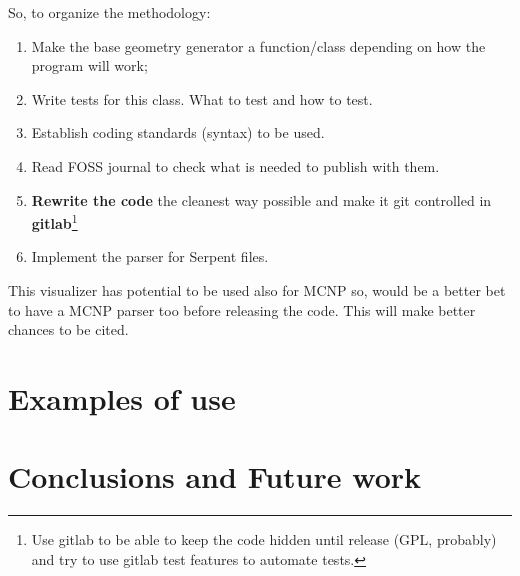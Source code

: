\documentclass{elsarticle}
\begin{document}
So, to organize the methodology:
\begin{enumerate}

\item Make the base geometry generator a function/class depending on how the program will work;
\item Write tests for this class. What to test and how to test.
\item Establish coding standards (syntax) to be used.
\item Read FOSS journal to check what is needed to publish with them.
\item \textbf{Rewrite the code} the cleanest way possible and make it git controlled in \textbf{gitlab}\footnote{Use gitlab to be able to keep the code hidden until release (GPL, probably) and try to use gitlab test features to automate tests.}
\item Implement the parser for Serpent files.
\end{enumerate}

This visualizer has potential to be used also for MCNP so, would be a better bet to have a MCNP parser too before releasing the code. This will
make better chances to be cited.

\section{Examples of use}

\section{Conclusions and Future work}



\end{document}
